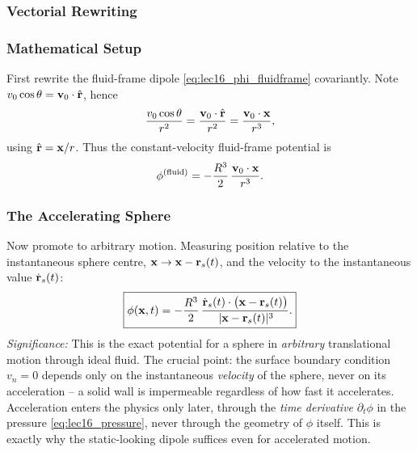 \documentclass[../main.tex]{subfiles}
\begin{document}
\subsubsection{Vectorial Rewriting}

\subsubsection*{Mathematical Setup}
First rewrite the fluid-frame dipole \eqref{eq:lec16_phi_fluidframe} covariantly. Note $v_0\cos\theta = \mathbf{v}_0\cdot\hat{\mathbf{r}}$, hence
\begin{equation}
  \frac{v_0\cos\theta}{r^2} = \frac{\mathbf{v}_0\cdot\hat{\mathbf{r}}}{r^2} = \frac{\mathbf{v}_0\cdot\mathbf{x}}{r^3},
  \label{eq:lec16_vector_rewrite}
\end{equation}
using $\hat{\mathbf{r}}=\mathbf{x}/r$. Thus the constant-velocity fluid-frame potential is
\begin{equation}
  \phi^{\text{(fluid)}} = -\frac{R^3}{2}\,\frac{\mathbf{v}_0\cdot\mathbf{x}}{r^3}.
  \label{eq:lec16_phi_vector}
\end{equation}

\subsubsection{The Accelerating Sphere}

Now promote to arbitrary motion. Measuring position relative to the instantaneous sphere centre, $\mathbf{x}\to\mathbf{x}-\mathbf{r}_s(t)$, and the velocity to the instantaneous value $\dot{\mathbf{r}}_s(t)$:
\begin{equation}
  \boxed{\phi(\mathbf{x},t) = -\frac{R^3}{2}\,\frac{\dot{\mathbf{r}}_s(t)\cdot\big(\mathbf{x}-\mathbf{r}_s(t)\big)}{\,\lvert\mathbf{x}-\mathbf{r}_s(t)\rvert^{3}}.}
  \label{eq:lec16_phi_general}
\end{equation}
\textit{Significance:} This is the exact potential for a sphere in \emph{arbitrary} translational motion through ideal fluid. The crucial point: the surface boundary condition $v_n=0$ depends only on the instantaneous \emph{velocity} of the sphere, never on its acceleration -- a solid wall is impermeable regardless of how fast it accelerates. Acceleration enters the physics only later, through the \emph{time derivative} $\partial_t\phi$ in the pressure \eqref{eq:lec16_pressure}, never through the geometry of $\phi$ itself. This is exactly why the static-looking dipole suffices even for accelerated motion.

\end{document}
